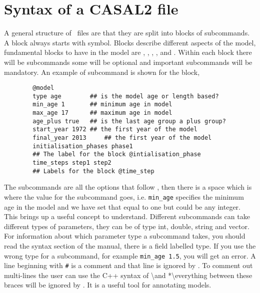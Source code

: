 \section{Syntax of a CASAL2 file}\label{Sec:stru}

A general structure of \CNAME\ files are that they are split into blocks of subcommands. A block always starts with \command{} symbol. Blocks describe different aspects of the model, fundamental blocks to have in the model are , , , , and . Within each block there will be subcommands some will be optional and important subcommands will be mandatory. An example of subcommand is shown for the  block,

{\small{\begin{verbatim}
		@model
		type age		## is the model age or length based?
		min_age 1		## minimum age in model
		max_age 17		## maximum age in model
		age_plus true	## is the last age group a plus group?
		start_year 1972	## the first year of the model
		final_year 2013 	## the first year of the model
		initialisation_phases phase1	
		## The label for the block @intialisation_phase
		time_steps step1 step2
		## Labels for the block @time_step
		\end{verbatim}}}
The subcommands are all the options that follow , then there is a space which is where the value for the subcommand goes, i.e. \texttt{min\_age} specifies the minimum age in the model and we have set that equal to one but could be any integer. This brings up a useful concept to understand. Different subcommands can take different types of parameters, they can be of type int, double, string and vector. For information about which parameter type a subcommand takes, you should read the syntax section of the manual, there is a field labelled type. If you use the wrong type for a subcommand, for example \texttt{min\_age 1.5}, you will get an error. A line beginning with \texttt{\#} is a comment and that line is ignored by \CNAME. To comment out multi-lines the user can use the C++ syntax of \textbackslash* and *\textbackslash everything between these braces will be ignored by \CNAME. It is a useful tool for annotating models. 

